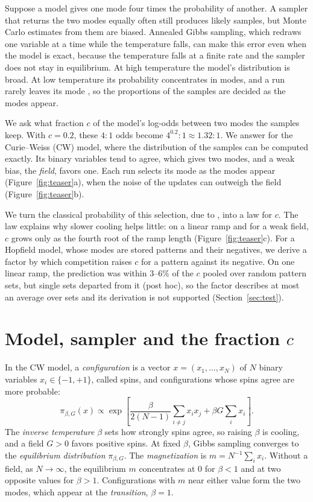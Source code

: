 \documentclass[final]{dynafront2026}
\begin{document}
Suppose a model gives one mode four times the probability of another. A
sampler that returns the two modes equally often still produces likely
samples, but Monte Carlo estimates from them are biased. Annealed Gibbs
sampling, which redraws one variable at a time while the temperature falls,
can make this error even when the model is exact, because the temperature
falls at a finite rate and the sampler does not stay in equilibrium. At high temperature the model's
distribution is broad. At low temperature its probability concentrates in
modes, and a run rarely leaves its mode \citep{levinluczak2010,dlpcmp2009},
so the proportions of the samples are decided as the modes appear.

We ask what fraction $c$ of the model's log-odds between two modes the
samples keep. With $c=0.2$, these $4{:}1$ odds become
$4^{0.2}{:}1\approx1.32{:}1$. We answer for the Curie--Weiss (CW) model,
where the distribution of the samples can be computed exactly. Its binary
variables tend to agree, which gives two modes, and a weak bias, the
\emph{field}, favors one. Each run selects its mode as the
modes appear (Figure~\ref{fig:teaser}a), when the noise of
the updates can outweigh the field (Figure~\ref{fig:teaser}b).

We turn the classical probability of this selection, due to
\citet{kondepudinelson1983} \citep[see also][]{kondepudigao1987,nene2018},
into a law for $c$. The law explains why slower cooling helps little: on a
linear ramp and for a weak field, $c$ grows only as the fourth root of the
ramp length (Figure~\ref{fig:teaser}c). For a Hopfield model, whose modes are stored
patterns and their negatives, we derive a factor by which competition raises
$c$ for a pattern against its negative. On one linear ramp, the prediction was within
$3$--$6\%$ of the $c$ pooled over random pattern sets, but single sets
departed from it (post hoc), so the factor describes at most an average over
sets and its derivation is not supported (Section~\ref{sec:test}).

\section{Model, sampler and the fraction \texorpdfstring{$c$}{c}}
\label{sec:model}

In the CW model, a \emph{configuration} is a vector $x=(x_1,\ldots,x_N)$ of
$N$ binary variables $x_i\in\{-1,+1\}$, called spins, and configurations
whose spins agree are more probable:
\begin{equation}
 \pi_{\beta,G}(x)\propto
 \exp\!\left[\frac{\beta}{2(N-1)}\sum_{i\ne j}x_i x_j
              +\beta G\sum_i x_i\right].
 \label{eq:model}
\end{equation}
The \emph{inverse temperature} $\beta$ sets how strongly spins agree, so
raising $\beta$ is cooling, and a field $G>0$ favors positive spins. At fixed
$\beta$, Gibbs sampling converges to the \emph{equilibrium distribution}
$\pi_{\beta,G}$. The \emph{magnetization} is $m=N^{-1}\sum_i x_i$. Without a field, as $N\to\infty$, the
equilibrium $m$ concentrates at $0$ for $\beta<1$ and at two opposite values
for $\beta>1$. Configurations with $m$ near either value form the two modes,
which appear at the \emph{transition}, $\beta=1$.
\end{document}
